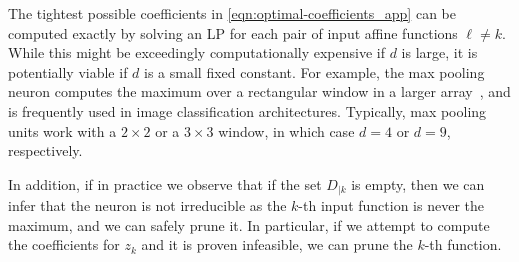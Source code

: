 \documentclass[smallextended]{svjour3}
\newcommand{\tx}{\widetilde{x}}
\begin{document}


The tightest possible coefficients in \eqref{eqn:optimal-coefficients_app} can be computed exactly by solving an LP for each pair of input affine functions $\ell \neq k$. While this might be exceedingly computationally expensive if $d$ is large, it is potentially viable if $d$ is a small fixed constant. For example, the max pooling neuron computes the maximum over a rectangular window in a larger array~\cite[Section 9.3]{Goodfellow:2016}, and is frequently used in image classification architectures. Typically, max pooling units work with a $2 \times 2$ or a $3 \times 3$ window, in which case $d=4$ or $d=9$, respectively.

In addition, if in practice we observe that if the set $D_{|k}$ is empty, then we can infer that the neuron is not irreducible as the $k$-th input function is never the maximum, and we can safely prune it. In particular, if we attempt to compute the coefficients for $z_k$ and it is proven infeasible, we can prune the $k$-th function.
\end{document}
